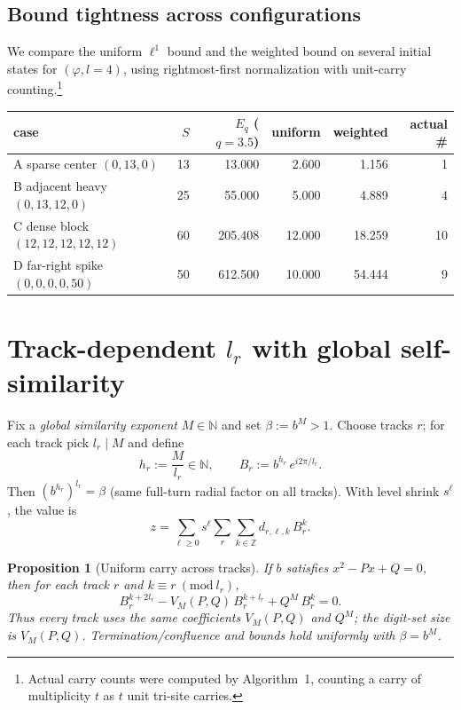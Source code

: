 \documentclass[11pt]{article}
\newtheorem{proposition}[theorem]{Proposition}
\theoremstyle{definition}
\theoremstyle{remark}
\newcommand{\Z}{\mathbb{Z}}
\newcommand{\N}{\mathbb{N}}
\begin{document}
\subsection*{Bound tightness across configurations}
We compare the uniform $\ell^1$ bound and the weighted bound on several initial states for $(\varphi,l{=}4)$, using rightmost-first normalization with unit-carry counting.\footnote{Actual carry counts were computed by Algorithm~1, counting a carry of multiplicity $t$ as $t$ unit tri-site carries.}

\begin{center}
\begin{tabular}{lrrrrr}
\hline
case & $S$ & $E_q$ ($q{=}3.5$) & uniform & weighted & actual \# \\
\hline
A\; sparse center $(0,13,0)$ & 13 & 13.000 & 2.600 & 1.156 & 1 \\
B\; adjacent heavy $(0,13,12,0)$ & 25 & 55.000 & 5.000 & 4.889 & 4 \\
C\; dense block $(12,12,12,12,12)$ & 60 & 205.408 & 12.000 & 18.259 & 10 \\
D\; far-right spike $(0,0,0,0,50)$ & 50 & 612.500 & 10.000 & 54.444 & 9 \\
\hline
\end{tabular}
\end{center}

\section{Track-dependent $l_r$ with global self-similarity}\label{sec:selfsimilar}
Fix a \emph{global similarity exponent} $M\in\N$ and set $\beta:=b^{M}>1$. Choose tracks $r$; for each track pick $l_r\mid M$ and define
\[
h_r:=\frac{M}{l_r}\in\N,\qquad B_r:=b^{h_r}\,e^{i2\pi/l_r}.
\]
Then $(b^{h_r})^{l_r}=\beta$ (same full-turn radial factor on all tracks). With level shrink $s^\ell$, the value is
\[
z=\sum_{\ell\ge0}s^\ell \sum_{r}\sum_{k\in\Z} d_{r,\ell,k}\,B_r^{k}.
\]

\begin{proposition}[Uniform carry across tracks]\label{prop:uniform}
If $b$ satisfies $x^2-Px+Q=0$, then for each track $r$ and $k\equiv r\ (\mathrm{mod}\ l_r)$,
\begin{equation}\label{eq:uniform}
B_r^{k+2l_r}-V_{M}(P,Q)\,B_r^{k+l_r}+Q^{M}\,B_r^{k}=0.
\end{equation}
Thus every track uses the \emph{same} coefficients $V_{M}(P,Q)$ and $Q^{M}$; the digit-set size is $V_{M}(P,Q)$. Termination/confluence and bounds hold uniformly with $\beta=b^{M}$.
\end{proposition}
\end{document}
